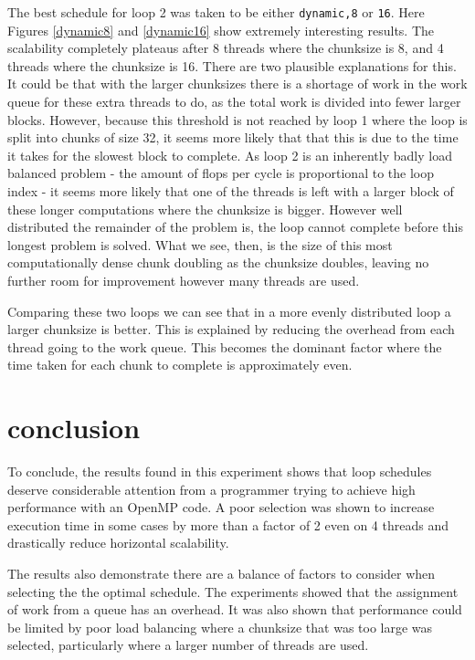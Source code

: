 \documentclass[a4paper,12pt]{article}
\begin{document}
The best schedule for loop 2 was taken to be either \verb|dynamic,8| or \verb|16|. Here Figures \ref{dynamic8} and \ref{dynamic16} show extremely interesting results. The scalability completely plateaus after 8 threads where the chunksize is 8, and 4 threads where the chunksize is 16. There are two plausible explanations for this. It could be that with the larger chunksizes there is a shortage of work in the work queue for these extra threads to do, as the total work is divided into fewer larger blocks. However, because this threshold is not reached by loop 1 where the loop is split into chunks of size 32,  it seems more likely that that this is due to the time it takes for the slowest block to complete. As loop 2 is an inherently badly load balanced problem - the amount of flops per cycle is proportional to the loop index - it seems more likely that one of the threads is left with a larger block of these longer computations where the chunksize is bigger. However well distributed the remainder of the problem is, the loop cannot complete before this longest problem is solved. What we see, then, is the size of this most computationally dense chunk doubling as the chunksize doubles, leaving no further room for improvement however many threads are used.

Comparing these two loops we can see that in a more evenly distributed loop a larger chunksize is better. This is explained by reducing the overhead from each thread going to the work queue. This becomes the dominant factor where the time taken for each chunk to complete is approximately even.



\section{conclusion}
To conclude, the results found in this experiment shows that loop schedules deserve considerable attention from a programmer trying to achieve high performance with an OpenMP code. A poor selection was shown to increase execution time in some cases by more than a factor of 2 even on 4 threads and drastically reduce horizontal scalability. 

The results also demonstrate there are a balance of factors to consider when selecting the the optimal schedule. The experiments showed that the assignment of work from a queue has an overhead. It was also shown that performance could be limited by poor load balancing where a chunksize that was too large was selected, particularly where a larger number of threads are used.
\end{document}
